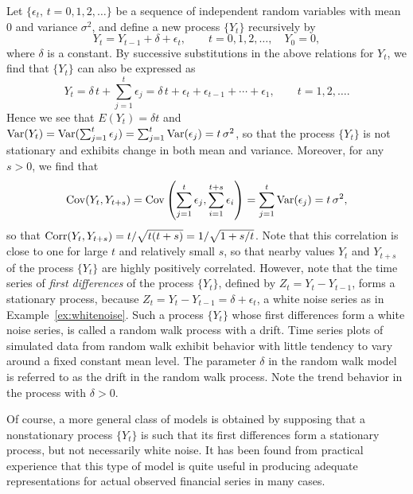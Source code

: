 \begin{ex} \label{ex:driftwalk} 
Let $\{ \epsilon_t, \, t=0,1,2, \ldots \}$ be a sequence of independent random variables with mean 0 and variance $\sigma^2$, and define a new process $\{ Y_t \}$ recursively by
	\[
	Y_t = Y_{t-1} + \delta + \epsilon_t, \qquad t=0,1,2, \ldots, \quad Y_0 = 0,
	\]
where $\delta$ is a constant.  By successive substitutions in the above relations for $Y_t$, we find that $\{Y_t\}$ can also be expressed as
	\[
	Y_t = \delta \, t + \sum_{j=1}^t \epsilon_j = \delta \, t + \epsilon_{t} + \epsilon_{t-1} + \cdots + \epsilon_{1}, \qquad t= 1, 2, \ldots .
	\]
Hence we see that $E(Y_t)= \delta t$ and $\operatorname{Var}(Y_t)= \operatorname{Var}(\sum_{j=1}^t \epsilon_j)= \sum_{j=1}^t \operatorname{Var}(\epsilon_j)= t \, \sigma^2$, so that the process $\{ Y_t \}$ is not stationary and exhibits change in both mean and variance.  Moreover, for any $s > 0$, we find that
	\[
	\operatorname{Cov}(Y_t,Y_{t+s})= \operatorname{Cov} \left( \sum_{j=1}^t \epsilon_j, \sum_{i=1}^{t+s} \epsilon_i \right)= \sum_{j=1}^t \operatorname{Var}(\epsilon_j) = t \, \sigma^2 ,
	\]
so that $\operatorname{Corr}(Y_t,Y_{t + s}) = t / \sqrt{t(t + s)} = 1/ \sqrt{1 + s/t}$. Note that this correlation is close to one for large $t$ and relatively small $s$, so that nearby values $Y_t$ and $Y_{t+s}$ of the process $\{Y_t\}$ are highly positively correlated.  However, note that the time series of \emph{first differences} of the process $\{ Y_t \}$, defined by $Z_{t}=Y_{t}-Y_{t-1}$, forms a stationary process, because $Z_{t}= Y_{t} - Y_{t-1} = \delta + \epsilon_t$, a white noise series as in Example~\ref{ex:whitenoise}. Such a process $\{ Y_t \}$ whose first differences form a white noise series, is called a random walk process with a drift. Time series plots of simulated data from random walk exhibit behavior with little tendency to vary around a fixed constant mean level. The parameter $\delta$ in the random walk model is referred to as the drift in the random walk process. Note the trend behavior in the process with $\delta > 0$. \xqed
\end{ex}


Of course, a more general class of models is obtained by supposing that a nonstationary process $\{ Y_t \}$ is such that its first differences form a stationary process, but not necessarily white noise.  It has been found from practical experience that this type of model is quite useful in producing adequate representations for actual observed financial series in many cases.




